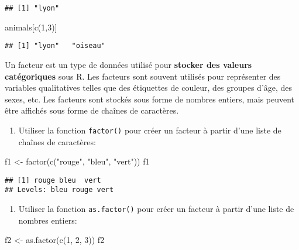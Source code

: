 \documentclass[
]{article}
\newenvironment{Shaded}{\begin{snugshade}}{\end{snugshade}}
\newcommand{\DecValTok}[1]{\textcolor[rgb]{0.00,0.00,0.81}{#1}}
\newcommand{\FunctionTok}[1]{\textcolor[rgb]{0.00,0.00,0.00}{#1}}
\newcommand{\NormalTok}[1]{#1}
\newcommand{\OtherTok}[1]{\textcolor[rgb]{0.56,0.35,0.01}{#1}}
\newcommand{\StringTok}[1]{\textcolor[rgb]{0.31,0.60,0.02}{#1}}
\providecommand{\tightlist}{%
  \setlength{\itemsep}{0pt}\setlength{\parskip}{0pt}}
\begin{document}
\begin{verbatim}
## [1] "lyon"
\end{verbatim}

\begin{Shaded}
\begin{Highlighting}[]
\NormalTok{animals[}\FunctionTok{c}\NormalTok{(}\DecValTok{1}\NormalTok{,}\DecValTok{3}\NormalTok{)]}
\end{Highlighting}
\end{Shaded}

\begin{verbatim}
## [1] "lyon"   "oiseau"
\end{verbatim}

Un facteur est un type de données utilisé pour \textbf{stocker des valeurs catégoriques} sous R. Les facteurs sont souvent utilisés pour représenter des variables qualitatives telles que des étiquettes de couleur, des groupes d'âge, des sexes, etc. Les facteurs sont stockés sous forme de nombres entiers, mais peuvent être affichés sous forme de chaînes de caractères.

\begin{enumerate}
\def\labelenumi{\arabic{enumi}.}
\tightlist
\item
  Utiliser la fonction \texttt{factor()} pour créer un facteur à partir d'une liste de chaînes de caractères:
\end{enumerate}

\begin{Shaded}
\begin{Highlighting}[]
\NormalTok{f1 }\OtherTok{\textless{}{-}} \FunctionTok{factor}\NormalTok{(}\FunctionTok{c}\NormalTok{(}\StringTok{"rouge"}\NormalTok{, }\StringTok{"bleu"}\NormalTok{, }\StringTok{"vert"}\NormalTok{))}
\NormalTok{f1}
\end{Highlighting}
\end{Shaded}

\begin{verbatim}
## [1] rouge bleu  vert 
## Levels: bleu rouge vert
\end{verbatim}

\begin{enumerate}
\def\labelenumi{\arabic{enumi}.}
\setcounter{enumi}{1}
\tightlist
\item
  Utiliser la fonction \texttt{as.factor()} pour créer un facteur à partir d'une liste de nombres entiers:
\end{enumerate}

\begin{Shaded}
\begin{Highlighting}[]
\NormalTok{f2 }\OtherTok{\textless{}{-}} \FunctionTok{as.factor}\NormalTok{(}\FunctionTok{c}\NormalTok{(}\DecValTok{1}\NormalTok{, }\DecValTok{2}\NormalTok{, }\DecValTok{3}\NormalTok{))}
\NormalTok{f2}
\end{Highlighting}
\end{Shaded}
\end{document}
